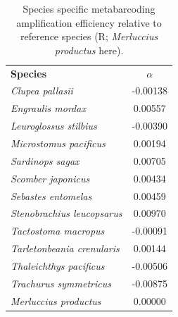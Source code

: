 \documentclass{article}
\begin{document}
\clearpage
\begin{table}\centering
\caption{Species specific metabarcoding amplification efficiency relative to reference species (R; \textit{Merluccius productus} here).}
    \begin{tabular}{lc}
\textbf{Species} & $\alpha$ \\
\textit{Clupea pallasii} &   -0.00138 \\
\textit{Engraulis mordax} &    0.00557 \\
\textit{Leuroglossus stilbius} &   -0.00390 \\
\textit{Microstomus pacificus} &    0.00194 \\
\textit{Sardinops sagax} &    0.00705 \\
\textit{Scomber japonicus} &    0.00434 \\
\textit{Sebastes entomelas} &    0.00459 \\
\textit{Stenobrachius leucopsarus} &    0.00970 \\
\textit{Tactostoma macropus} &   -0.00091 \\
\textit{Tarletonbeania crenularis} &    0.00144 \\
\textit{Thaleichthys pacificus} &   -0.00506 \\
\textit{Trachurus symmetricus} &   -0.00875 \\
\textit{Merluccius productus} &    0.00000 \\
    \end{tabular}
        \label{tab:alphas}
\end{table}
\clearpage


\end{document}
